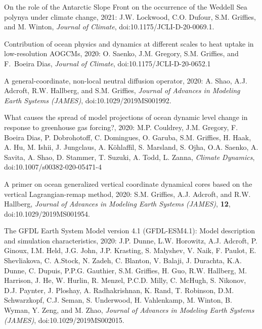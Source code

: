 \begin{etaremune}
\item On the role of the Antarctic Slope Front on the occurrence of the Weddell Sea polynya under climate change, 2021: J.W. Lockwood, C.O. Dufour, S.M. Grif\/f\/ies, and M. Winton, {\it Journal of Climate}, doi:10.1175/JCLI-D-20-0069.1.

\item Contribution of ocean physics and dynamics at different scales to heat uptake in low-resolution AOGCMs, 2020: O. Saenko, J.M. Gregory, S.M. Grif\/f\/ies, and F.\ Boeira Dias, {\it Journal of Climate}, doi:10.1175/JCLI-D-20-0652.1

\item A general-coordinate, non-local neutral diffusion operator, 2020: A. Shao, A.J. Adcroft, R.W. Hallberg, and S.M. Grif\/f\/ies, {\it Journal of Advances in Modeling Earth Systems (JAMES)}, doi:10.1029/2019MS001992.

\item What causes the spread of model projections of ocean dynamic level change in response to greenhouse gas forcing?, 2020:  M.P. Couldrey, J.M. Gregory,  F. Boeira Dias, P. Dobrohotoff, C. Domingues, O. Garuba, S.M. Griffies, H. Haak, A. Hu, M. Ishii, J. Jungclaus, A. {K\"{o}hlaffil}, S. Marsland, S. Ojha, O.A. Saenko, A. Savita, A. Shao, D. Stammer, T. Suzuki, A. Todd, L. Zanna, {\it Climate Dynamics}, doi:10.1007/s00382-020-05471-4



\item A primer on ocean generalized vertical coordinate dynamical cores based on the vertical Lagrangian-remap method, 2020: S.M. Grif\/f\/ies, A.J. Adcroft, and R.W. Hallberg, {\it Journal of Advances in Modeling Earth Systems (JAMES)}, {\bf 12}, \\ doi:10.1029/2019MS001954.

\item The GFDL Earth System Model version 4.1 (GFDL-ESM4.1): Model description and simulation characteristics, 2020: J.P. Dunne, L.W. Horowitz, A.J. Adcroft, P. Ginoux, I.M. Held, J.G. John, J.P. Krasting, S. Malyshev, V. Naik, F. Paulot, E. Shevliakova, C. A.Stock, N. Zadeh, C. Blanton, V. Balaji, J. Durachta, K.A. Dunne, C. Dupuis, P.P.G. Gauthier, S.M. Griffies, H. Guo, R.W. Hallberg, M. Harrison, J. He, W. Hurlin, R. Menzel, P.C.D. Milly, C. McHugh, S. Nikonov, D.J. Paynter, J. Ploshay, A. Radhakrishnan, K. Rand, T. Robinson, D.M. Schwarzkopf, C.J. Seman, S. Underwood, H. Vahlenkamp, M. Winton, B. Wyman, Y. Zeng, and M. Zhao, {\it Journal of Advances in Modeling Earth Systems (JAMES)}, doi:10.1029/2019MS002015.


\end{etaremune}
